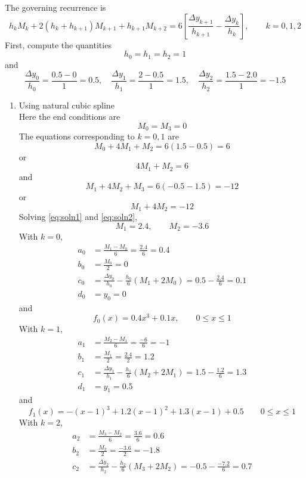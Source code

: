 \documentclass[12pt,class=book,crop=false]{standalone}
\begin{document}
\begin{soln}
	The governing recurrence is
	\[
		h_k M_k+2(h_k+h_{k+1})M_{k+1}+h_{k+1} M_{k+2}=6\left[\frac{\Delta y_{k+1}}{h_{k+1}} -\frac{\Delta y_k}{h_k} \right],\qquad k = 0, 1, 2
	\] 
	First, compute the quantities
	\[
		h_0=h_1=h_2=1
	\]
	and
	\[
		\frac{\Delta y_0}{h_0} =\frac{0.5-0}{1}=0.5,\quad\frac{ \Delta y_1}{h_1} =\frac{2-0.5}{1}=1.5,\quad \frac{\Delta y_2}{h_2} =\frac{1.5-2.0}{1}=-1.5
	\]
	\begin{enumerate}[label=(\alph*)]
		\item Using natural cubic spline\\
		Here the end conditions are
		\[
			M_0=M_3=0
		\]
		The equations corresponding to $ k = 0, 1 $ are
		\[
			M_0+4M_1+M_2=6(1.5-0.5)=6
		\]
		or
		\begin{equation}
			\label{eq:soln1}
			4M_1+M_2=6
		\end{equation}
		and
		\begin{equation*}	
			M_1+4M_2+M_3=6(-0.5-1.5)=-12
		\end{equation*}
		or
		\begin{equation}
			\label{eq:soln2}
			M_1+4M_2=-12
		\end{equation}
		Solving \eqref{eq:soln1} and \eqref{eq:soln2},
		\[
			M_1=2.4,\qquad M_2=-3.6
		\]
		With $ k = 0 $,
		\begin{align*}
			a_0&=\frac{M_1-M_0}{6}=\frac{2.4}{6}=0.4\\
			b_0&=\frac{M_0}{2}=0\\
			c_0&=\frac{\Delta y_0}{h_0} -\frac{h_0}{6}(M_1+2M_0)=0.5-\frac{2.4}{6}=0.1\\
			d_0&=y_0=0
		\end{align*}
		and
		\[
			f_0 (x)=0.4x^3+0.1x,\qquad 0 \leq x \leq 1
		\]
		With $ k = 1 $,
		\begin{align*}
			a_1&=\frac{M_2-M_1}{6}=\frac{-6}{6}=-1\\
			b_1&=\frac{M_1}{2}=\frac{2.4}{2}=1.2\\
			c_1&=\frac{\Delta y_1}{h_1} -\frac{h_1}{6}(M_2+2M_1)=1.5-\frac{1.2}{6}=1.3\\	
			d_1&=y_1=0.5
		\end{align*}
		and
		\[
			f_1 (x)=-(x-1)^3+1.2(x-1)^2+1.3(x-1)+0.5\qquad 0 \leq x \leq 1
		\]
		With $ k = 2 $,
		\begin{align*}
			a_2&=\frac{M_3-M_2}{6}=\frac{3.6}{6}=0.6\\
			b_2&=\frac{M_2}{2}=\frac{-3.6}{2}=-1.8\\
			c_2&=\frac{\Delta y_2}{h_2} -\frac{h_2}{6}(M_3+2M_2)=-0.5-\frac{-7.2}{6}=0.7\\

\end{align*}
\end{enumerate}
\end{soln}
\end{document}
